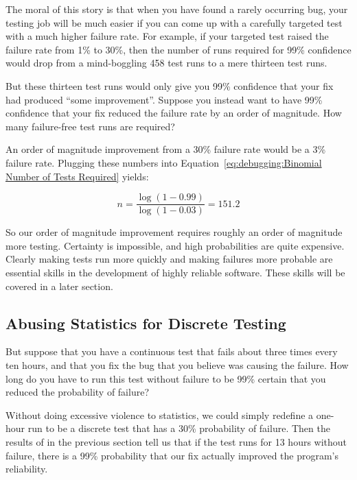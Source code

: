 The moral of this story is that when you have found a rarely occurring
bug, your testing job will be much easier if you can come up with
a carefully targeted test with a much higher failure rate.
For example, if your targeted test raised the failure rate from 1\%
to 30\%, then the number of runs required for 99\% confidence
would drop from a mind-boggling 458 test runs to a mere thirteen test runs.

But these thirteen test runs would only give you 99\% confidence that
your fix had produced ``some improvement''.
Suppose you instead want to have 99\% confidence that your fix reduced
the failure rate by an order of magnitude.
How many failure-free test runs are required?

An order of magnitude improvement from a 30\% failure rate would be
a 3\% failure rate.
Plugging these numbers into
Equation~\ref{eq:debugging:Binomial Number of Tests Required} yields:

\begin{equation}
	n = \frac{\log\left(1 - 0.99\right)}{\log\left(1 - 0.03\right)} = 151.2
\end{equation}

So our order of magnitude improvement requires roughly an order of
magnitude more testing.
Certainty is impossible, and high probabilities are quite expensive.
Clearly making tests run more quickly and making failures more probable
are essential skills in the development of highly reliable software.
These skills will be covered in a later section.

\subsection{Abusing Statistics for Discrete Testing}
\label{sec:Abusing Statistics for Discrete Testing}

But suppose that you have a continuous test that fails about three
times every ten hours, and that you fix the bug that you believe was
causing the failure.
How long do you have to run this test without failure to be 99\% certain
that you reduced the probability of failure?

Without doing excessive violence to statistics, we could simply
redefine a one-hour run to be a discrete test that has a 30\%
probability of failure.
Then the results of in the previous section tell us that if the test
runs for 13 hours without failure, there is a 99\% probability that
our fix actually improved the program's reliability.

